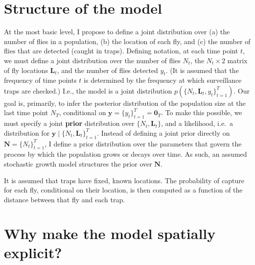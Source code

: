 \documentclass[
]{book}
\begin{document}
\hypertarget{structure-of-the-model}{%
\section{Structure of the model}\label{structure-of-the-model}}

At the most basic level, I propose to define a joint distribution over (a) the number of flies in a population, (b) the location of each fly, and (c) the number of flies that are detected (caught in traps). Defining notation, at each time point \(t\), we must define a joint distribution over the number of flies \(N_t\), the \(N_t \times 2\) matrix of fly locations \(\mathbf L_t\), and the number of flies detected \(y_t\). (It is assumed that the frequency of time points \(t\) is determined by the frequency at which surveillance traps are checked.) I.e., the model is a joint distribution \(p(\{N_t, \mathbf L_t, y_t\}_{t=1}^T)\). Our goal is, primarily, to infer the posterior distribution of the population size at the last time point \(N_T\), conditional on \(\mathbf y = \{y_t\}_{t=1}^T = \mathbf 0_T\). To make this possible, we must specify a joint \textbf{prior} distribution over \(\{N_t, \mathbf L_t\}\), and a likelihood, i.e.~a distribution for \(\mathbf y \mid \{N_t, \mathbf L_t\}_{t=1}^T\). Instead of defining a joint prior directly on \(\mathbf N = \{N_t\}_{t=1}^T\), I define a prior distribution over the parameters that govern the process by which the population grows or decays over time. As such, an assumed stochastic growth model structures the prior over \(\mathbf N\).

It is assumed that traps have fixed, known locations. The probability of capture for each fly, conditional on their location, is then computed as a function of the distance between that fly and each trap.

\hypertarget{why-make-the-model-spatially-explicit}{%
\section{Why make the model spatially explicit?}\label{why-make-the-model-spatially-explicit}}
\end{document}
